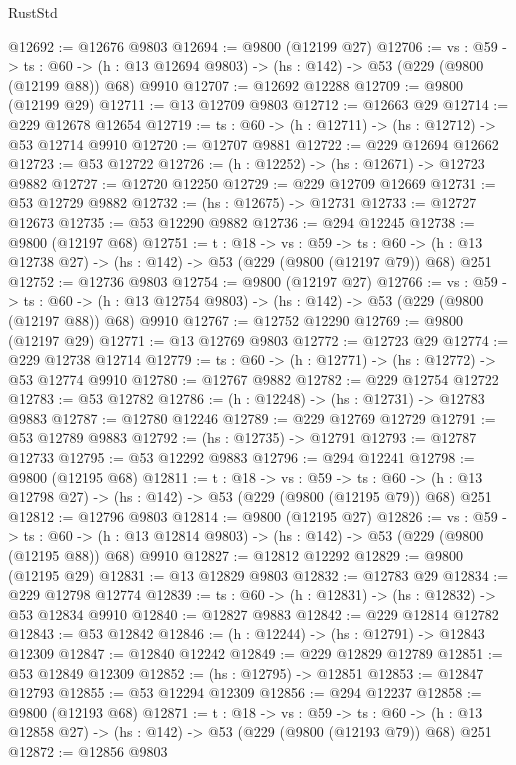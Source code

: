 \begin{lexlean}{RustStd}
\begin{coremodule}
@12692 := @12676 @9803
@12694 := @9800 (@12199 @27)
@12706 := {vs : @59} ->
  {ts : @60} -> (h : @13 @12694 @9803) -> (hs : @142) -> @53 (@229 (@9800 (@12199 @88)) @68) @9910
@12707 := @12692 @12288
@12709 := @9800 (@12199 @29)
@12711 := @13 @12709 @9803
@12712 := @12663 @29
@12714 := @229 @12678 @12654
@12719 := {ts : @60} -> (h : @12711) -> (hs : @12712) -> @53 @12714 @9910
@12720 := @12707 @9881
@12722 := @229 @12694 @12662
@12723 := @53 @12722
@12726 := (h : @12252) -> (hs : @12671) -> @12723 @9882
@12727 := @12720 @12250
@12729 := @229 @12709 @12669
@12731 := @53 @12729 @9882
@12732 := (hs : @12675) -> @12731
@12733 := @12727 @12673
@12735 := @53 @12290 @9882
@12736 := @294 @12245
@12738 := @9800 (@12197 @68)
@12751 := {t : @18} ->
  {vs : @59} ->
  {ts : @60} -> (h : @13 @12738 @27) -> (hs : @142) -> @53 (@229 (@9800 (@12197 @79)) @68) @251
@12752 := @12736 @9803
@12754 := @9800 (@12197 @27)
@12766 := {vs : @59} ->
  {ts : @60} -> (h : @13 @12754 @9803) -> (hs : @142) -> @53 (@229 (@9800 (@12197 @88)) @68) @9910
@12767 := @12752 @12290
@12769 := @9800 (@12197 @29)
@12771 := @13 @12769 @9803
@12772 := @12723 @29
@12774 := @229 @12738 @12714
@12779 := {ts : @60} -> (h : @12771) -> (hs : @12772) -> @53 @12774 @9910
@12780 := @12767 @9882
@12782 := @229 @12754 @12722
@12783 := @53 @12782
@12786 := (h : @12248) -> (hs : @12731) -> @12783 @9883
@12787 := @12780 @12246
@12789 := @229 @12769 @12729
@12791 := @53 @12789 @9883
@12792 := (hs : @12735) -> @12791
@12793 := @12787 @12733
@12795 := @53 @12292 @9883
@12796 := @294 @12241
@12798 := @9800 (@12195 @68)
@12811 := {t : @18} ->
  {vs : @59} ->
  {ts : @60} -> (h : @13 @12798 @27) -> (hs : @142) -> @53 (@229 (@9800 (@12195 @79)) @68) @251
@12812 := @12796 @9803
@12814 := @9800 (@12195 @27)
@12826 := {vs : @59} ->
  {ts : @60} -> (h : @13 @12814 @9803) -> (hs : @142) -> @53 (@229 (@9800 (@12195 @88)) @68) @9910
@12827 := @12812 @12292
@12829 := @9800 (@12195 @29)
@12831 := @13 @12829 @9803
@12832 := @12783 @29
@12834 := @229 @12798 @12774
@12839 := {ts : @60} -> (h : @12831) -> (hs : @12832) -> @53 @12834 @9910
@12840 := @12827 @9883
@12842 := @229 @12814 @12782
@12843 := @53 @12842
@12846 := (h : @12244) -> (hs : @12791) -> @12843 @12309
@12847 := @12840 @12242
@12849 := @229 @12829 @12789
@12851 := @53 @12849 @12309
@12852 := (hs : @12795) -> @12851
@12853 := @12847 @12793
@12855 := @53 @12294 @12309
@12856 := @294 @12237
@12858 := @9800 (@12193 @68)
@12871 := {t : @18} ->
  {vs : @59} ->
  {ts : @60} -> (h : @13 @12858 @27) -> (hs : @142) -> @53 (@229 (@9800 (@12193 @79)) @68) @251
@12872 := @12856 @9803

\end{coremodule}
\end{lexlean}
